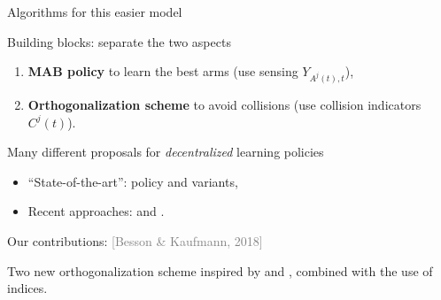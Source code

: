 \documentclass[12pt,english,ignorenonframetext,aspectratio=169,]{beamer}
\providecommand{\tightlist}{%
  \setlength{\itemsep}{0pt}\setlength{\parskip}{0pt}}
\begin{document}
\begin{frame}{Algorithms for this easier model}

\begin{block}{Building blocks: separate the two aspects}

\begin{enumerate}
\def\labelenumi{\arabic{enumi}.}
\tightlist
\item
  \textbf{MAB policy} to learn the best arms (use sensing
  \(Y_{A^j(t),t}\)),
\item
  \textbf{Orthogonalization scheme} to avoid collisions (use collision indicators
  \(C^j(t)\)).
\end{enumerate}

\end{block}

\begin{block}{Many different proposals for \emph{decentralized} learning
policies}

\begin{itemize}\tightlist
\item
  ``State-of-the-art'': \rhoRand{} policy and variants,
\item
  Recent approaches: \MEGA{} and \MusicalChair{}.
\end{itemize}

\end{block}

\begin{exampleblock}{Our contributions:
\hfill{}\textcolor{gray}{[Besson \& Kaufmann, 2018]}}


  Two new orthogonalization scheme inspired by \RhoRand{} and \MusicalChair{},
  combined with the use of \klUCB{} indices.

\end{exampleblock}

\end{frame}




\end{document}
